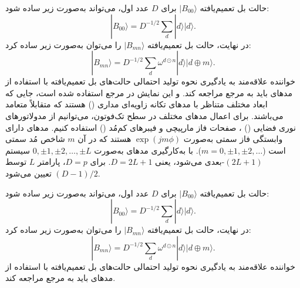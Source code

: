 حالت بل تعمیم‌یافته $|B_{00}\rangle$ برای $D$ عدد اول، می‌تواند به‌صورت زیر ساده شود:
\begin{equation}
	|B_{00}\rangle = D^{-1/2} \sum_d |d\rangle |d\rangle.
	\label{eq:8-112}
\end{equation}
در نهایت، حالت بل تعمیم‌یافته $|B_{mn}\rangle$ را می‌توان به‌صورت زیر ساده کرد:
\begin{equation}
	|B_{mn}\rangle = D^{-1/2} \sum_d \omega^{d \odot n} |d\rangle |d \oplus m\rangle.
	\label{eq:8-113}
\end{equation}
خواننده علاقه‌مند به یادگیری نحوه تولید احتمالی حالت‌های بل تعمیم‌یافته با استفاده از مدهای  باید به مرجع \cite{8-32} مراجعه کند.
و این نمایش در مرجع \cite{8-32} استفاده شده است، جایی که ابعاد مختلف متناظر با مدهای تکانه زاویه‌ای مداری () هستند که متقابلاً متعامد می‌باشند. برای اعمال مدهای مختلف  در سطح تک‌فوتون، می‌توانیم از مدولاتورهای نوری فضایی () \cite{8-87, 8-88, 8-89}، صفحات فاز مارپیچی و فیبرهای کم‌مُد () \cite{8-32} استفاده کنیم. مدهای  دارای وابستگی فاز سمتی به‌صورت $\exp(jm\phi)$ هستند که در آن $m$ شاخص مُد سمتی است ($m = 0, \pm 1, \pm 2, \dots$). با به‌کارگیری مدهای  به‌صورت $0, \pm 1, \pm 2, \dots, \pm L$ سیستم $(2L + 1)$-بعدی می‌شود، یعنی $D = 2L + 1$. برای $D = p$، پارامتر $L$ توسط $(D-1)/2$ تعیین می‌شود.

حالت بل تعمیم‌یافته $|B_{00}\rangle$ برای $D$ عدد اول، می‌تواند به‌صورت زیر ساده شود:
\begin{equation}
	|B_{00}\rangle = D^{-1/2} \sum_d |d\rangle |d\rangle.
	\label{eq:8-112}
\end{equation}
در نهایت، حالت بل تعمیم‌یافته $|B_{mn}\rangle$ را می‌توان به‌صورت زیر ساده کرد:
\begin{equation}
	|B_{mn}\rangle = D^{-1/2} \sum_d \omega^{d \odot n} |d\rangle |d \oplus m\rangle.
	\label{eq:8-113}
\end{equation}
خواننده علاقه‌مند به یادگیری نحوه تولید احتمالی حالت‌های بل تعمیم‌یافته با استفاده از مدهای  باید به مرجع \cite{8-32} مراجعه کند.






